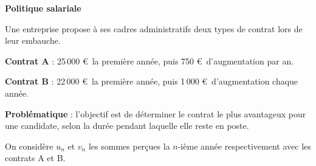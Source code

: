 \documentclass[12pt,a4paper]{book}
\begin{document}
\exerciceDS{} \textbf{Politique salariale}

Une entreprise propose à ses cadres administratifs deux types de contrat lors de leur embauche.

\begin{itemMet}
	\item \textbf{Contrat A} : 25\,000 \euro\ la première année, puis 750 \euro\ d'augmentation par an.
	\item \textbf{Contrat B} : 22\,000 \euro\ la première année, puis 1\,000 \euro\ d'augmentation chaque année.
\end{itemMet}

\noindent\textbf{Problématique} : l'objectif est de déterminer le contrat le plus avantageux pour une candidate, selon la durée pendant laquelle elle reste en poste.

On considère $u_n$ et $v_n$ les sommes perçues la $n$-ième année respectivement avec les contrats A et B.
\end{document}
